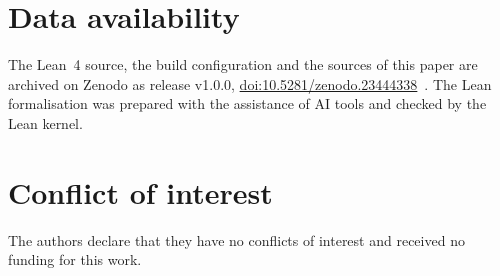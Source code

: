 \documentclass[aps,prd,twocolumn,superscriptaddress,nofootinbib,floatfix]{revtex4-2}
\theoremstyle{definition}
\theoremstyle{remark}
\begin{document}
\section*{Data availability}

The Lean~4 source, the build configuration and the sources of this paper
are archived on Zenodo as release v1.0.0,
\href{https://doi.org/10.5281/zenodo.23444338}{doi:10.5281/zenodo.23444338}~\cite{Repo}. The Lean formalisation was prepared with
the assistance of AI tools and checked by the Lean kernel.

\section*{Conflict of interest}

The authors declare that they have no conflicts of interest and received
no funding for this work.
\end{document}
